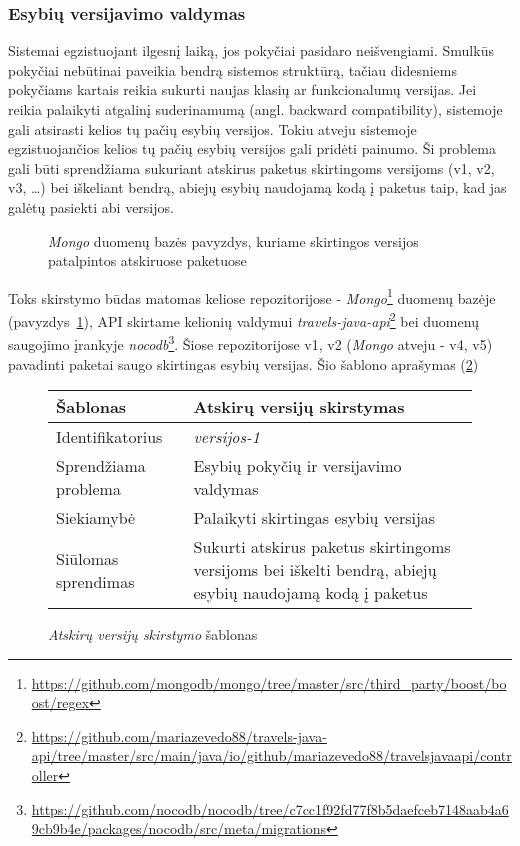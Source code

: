 \subsubsection{Esybių versijavimo valdymas}
Sistemai egzistuojant ilgesnį laiką, jos pokyčiai pasidaro neišvengiami.
Smulkūs pokyčiai nebūtinai paveikia bendrą sistemos struktūrą, tačiau
didesniems pokyčiams kartais reikia sukurti naujas klasių ar funkcionalumų versijas. Jei reikia palaikyti atgalinį
suderinamumą (angl. backward compatibility), sistemoje gali atsirasti kelios tų pačių esybių versijos.
Tokiu atveju sistemoje egzistuojančios kelios tų pačių esybių versijos gali pridėti painumo.
Ši problema gali būti sprendžiama sukuriant atskirus paketus skirtingoms
versijoms (v1, v2, v3, \ldots) bei iškeliant bendrą, abiejų esybių naudojamą kodą į paketus taip, kad jas galėtų pasiekti abi versijos.
\begin{figure}[H]
    \snugshade
    \endsnugshade
    \caption{\textit{Mongo} duomenų bazės pavyzdys, kuriame skirtingos versijos patalpintos atskiruose paketuose}
    \label{fig:mongo}
\end{figure}
Toks skirstymo būdas matomas keliose repozitorijose - \textit{Mongo}\footnote{\url{https://github.com/mongodb/mongo/tree/master/src/third_party/boost/boost/regex}} duomenų bazėje (pavyzdys~\ref{fig:mongo}),
API skirtame kelionių valdymui \textit{travels-java-api}\footnote{\url{https://github.com/mariazevedo88/travels-java-api/tree/master/src/main/java/io/github/mariazevedo88/travelsjavaapi/controller}}
 bei duomenų saugojimo įrankyje \textit{nocodb}\footnote{\url{https://github.com/nocodb/nocodb/tree/c7cc1f92fd77f8b5daefceb7148aab4a69cb9b4e/packages/nocodb/src/meta/migrations}}.
Šiose repozitorijose v1, v2 (\textit{Mongo} atveju - v4, v5) pavadinti paketai saugo skirtingas esybių versijas.
Šio šablono aprašymas (\ref{table:versions})
\begin{figure}[H]
\begin{center}
    \begin{tabular}{|p{5cm}|p{10cm}|}
        \hline
        Šablonas & Atskirų versijų skirstymas \\ [0.5ex]
        \hline\hline
        Identifikatorius & \textit{versijos-1} \\
        \hline
        Sprendžiama problema & Esybių pokyčių ir versijavimo valdymas\\
        \hline
        Siekiamybė & Palaikyti skirtingas esybių versijas \\
        \hline
        Siūlomas sprendimas & Sukurti atskirus paketus skirtingoms versijoms bei iškelti bendrą, abiejų esybių naudojamą kodą į paketus \\
        \hline
    \end{tabular}
\end{center}
\caption{\textit{Atskirų versijų skirstymo} šablonas}
\label{table:versions}
\end{figure}

